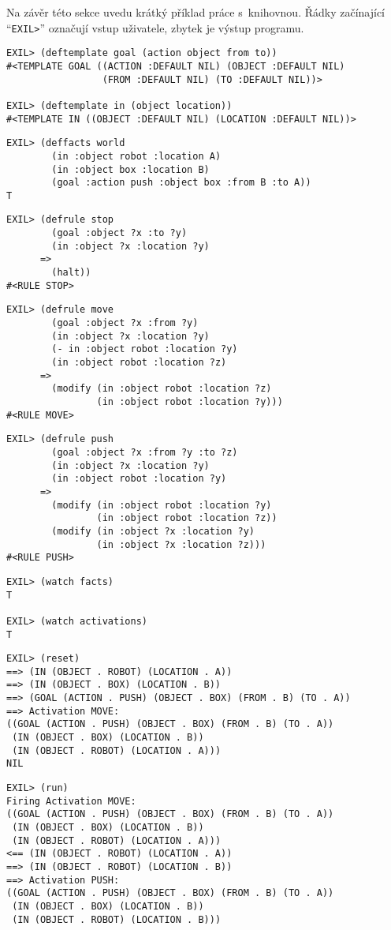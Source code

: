 Na závěr této sekce uvedu krátký příklad práce s~knihovnou. Řádky začínající
``\verb|EXIL>|'' označují vstup uživatele, zbytek je výstup programu.
\begin{verbatim}
EXIL> (deftemplate goal (action object from to))
#<TEMPLATE GOAL ((ACTION :DEFAULT NIL) (OBJECT :DEFAULT NIL)
                 (FROM :DEFAULT NIL) (TO :DEFAULT NIL))>

EXIL> (deftemplate in (object location))
#<TEMPLATE IN ((OBJECT :DEFAULT NIL) (LOCATION :DEFAULT NIL))>
\end{verbatim}
\begin{verbatim}
EXIL> (deffacts world
        (in :object robot :location A)
        (in :object box :location B)
        (goal :action push :object box :from B :to A))
T
\end{verbatim}
\begin{verbatim}
EXIL> (defrule stop
        (goal :object ?x :to ?y)
        (in :object ?x :location ?y)
      =>
        (halt))
#<RULE STOP>
\end{verbatim}
\begin{verbatim}
EXIL> (defrule move
        (goal :object ?x :from ?y)
        (in :object ?x :location ?y)
        (- in :object robot :location ?y)
        (in :object robot :location ?z)
      =>
        (modify (in :object robot :location ?z)
                (in :object robot :location ?y)))
#<RULE MOVE>
\end{verbatim}
\begin{verbatim}
EXIL> (defrule push
        (goal :object ?x :from ?y :to ?z)
        (in :object ?x :location ?y)
        (in :object robot :location ?y)
      =>
        (modify (in :object robot :location ?y)
                (in :object robot :location ?z))
        (modify (in :object ?x :location ?y)
                (in :object ?x :location ?z)))
#<RULE PUSH>
\end{verbatim}
\begin{verbatim}
EXIL> (watch facts)
T

EXIL> (watch activations)
T
\end{verbatim}
\begin{verbatim}
EXIL> (reset)
==> (IN (OBJECT . ROBOT) (LOCATION . A))
==> (IN (OBJECT . BOX) (LOCATION . B))
==> (GOAL (ACTION . PUSH) (OBJECT . BOX) (FROM . B) (TO . A))
==> Activation MOVE:
((GOAL (ACTION . PUSH) (OBJECT . BOX) (FROM . B) (TO . A))
 (IN (OBJECT . BOX) (LOCATION . B))
 (IN (OBJECT . ROBOT) (LOCATION . A)))
NIL
\end{verbatim}
\begin{verbatim}
EXIL> (run)
Firing Activation MOVE:
((GOAL (ACTION . PUSH) (OBJECT . BOX) (FROM . B) (TO . A))
 (IN (OBJECT . BOX) (LOCATION . B))
 (IN (OBJECT . ROBOT) (LOCATION . A)))
<== (IN (OBJECT . ROBOT) (LOCATION . A))
==> (IN (OBJECT . ROBOT) (LOCATION . B))
==> Activation PUSH:
((GOAL (ACTION . PUSH) (OBJECT . BOX) (FROM . B) (TO . A))
 (IN (OBJECT . BOX) (LOCATION . B))
 (IN (OBJECT . ROBOT) (LOCATION . B)))
\end{verbatim}
